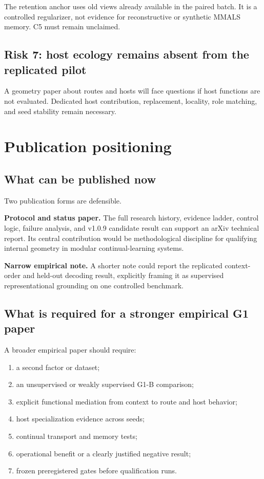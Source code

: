 \documentclass[11pt,a4paper]{article}
\begin{document}
The retention anchor uses old views already available in the paired batch. It is a controlled regularizer, not evidence for reconstructive or synthetic MMALS memory. C5 must remain unclaimed.

\subsection{Risk 7: host ecology remains absent from the replicated pilot}

A geometry paper about routes and hosts will face questions if host functions are not evaluated. Dedicated host contribution, replacement, locality, role matching, and seed stability remain necessary.

\section{Publication positioning}

\subsection{What can be published now}

Two publication forms are defensible.

\textbf{Protocol and status paper.} The full research history, evidence ladder, control logic, failure analysis, and v1.0.9 candidate result can support an arXiv technical report. Its central contribution would be methodological discipline for qualifying internal geometry in modular continual-learning systems.

\textbf{Narrow empirical note.} A shorter note could report the replicated context-order and held-out decoding result, explicitly framing it as supervised representational grounding on one controlled benchmark.

\subsection{What is required for a stronger empirical G1 paper}

A broader empirical paper should require:

\begin{enumerate}
\item a second factor or dataset;
\item an unsupervised or weakly supervised G1-B comparison;
\item explicit functional mediation from context to route and host behavior;
\item host specialization evidence across seeds;
\item continual transport and memory tests;
\item operational benefit or a clearly justified negative result;
\item frozen preregistered gates before qualification runs.
\end{enumerate}
\end{document}
